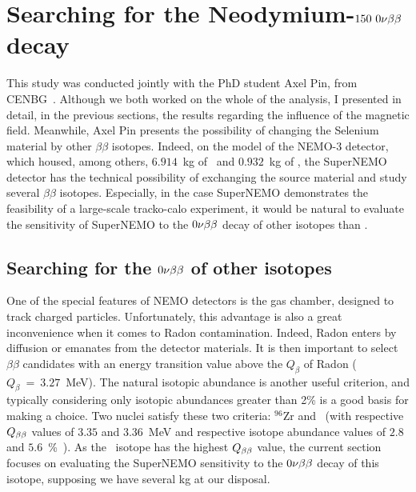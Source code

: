 \section{Searching for the Neodymium-$150~0\nu\beta\beta$ decay}
\label{sec:Nd}

This study was conducted jointly with the PhD student Axel Pin, from CENBG~\cite{AxelThesis}.
Although we both worked on the whole of the analysis, I presented in detail, in the previous sections, the results regarding the influence of the magnetic field.
Meanwhile, Axel Pin presents the possibility of changing the Selenium material by other $\beta\beta$ isotopes.
Indeed, on the model of the NEMO-$3$ detector, which housed, among others, $6.914$~kg of \Mo\ and $0.932$~kg of \Se, the SuperNEMO detector has the technical possibility of exchanging the source material and study several $\beta\beta$ isotopes.
Especially, in the case SuperNEMO demonstrates the feasibility of a large-scale tracko-calo experiment, it would be natural to  evaluate the sensitivity of SuperNEMO to the $0\nu\beta\beta$ decay of other isotopes than \Se.

\subsection{Searching for the $0\nu\beta\beta$ of other isotopes}

One of the special features of NEMO detectors is the gas chamber, designed to track charged particles.
Unfortunately, this advantage is also a great inconvenience when it comes to Radon contamination.
Indeed, Radon enters by diffusion or emanates from the detector materials.
It is then important to select $\beta\beta$ candidates with an energy transition value above the $Q_{\beta}$ of Radon ($Q_{\beta}~=~3.27$~MeV).
The natural isotopic abundance is another useful criterion, and typically considering only isotopic abundances greater than 2\% is a good basis for making a choice.
Two nuclei satisfy these two criteria: $^{96}$Zr and \Nd\ (with respective $Q_{\beta\beta}$ values of $3.35$ and $3.36$~MeV and respective isotope abundance values of $2.8$ and $5.6$~\%~\cite{art:atomic_mass}).
As the \Nd\ isotope has the highest $Q_{\beta\beta}$ value, the current section focuses on evaluating the SuperNEMO sensitivity to the $0\nu\beta\beta$ decay of this isotope, supposing we have several kg at our disposal.

